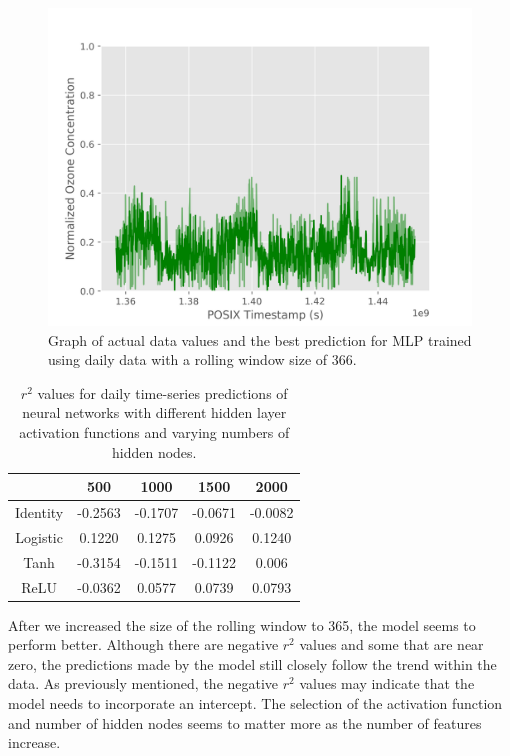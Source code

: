 \documentclass{article}
\begin{document}
\begin{figure}[H]
    \begin{center}
        \includegraphics[scale=0.75]{D366_500_TANH.png}
    \end{center}
    \caption{Graph of actual data values and the best prediction for MLP trained using daily data with a rolling window size of 366.}
\end{figure}

\begin{table}[H]
    \centering
    \begin{tabular}{| c | c | c | c | c |}
        \hline
        \cellcolor{black} & \cellcolor{Gray} 500 & \cellcolor{Gray} 1000 & \cellcolor{Gray} 1500 & \cellcolor{Gray} 2000 \\
        \hline
        \cellcolor{Gray} Identity & -0.2563 & -0.1707 & -0.0671 & -0.0082 \\
        \hline
        \cellcolor{Gray} Logistic & 0.1220 & 0.1275 & 0.0926 & 0.1240 \\
        \hline
        \cellcolor{Gray} Tanh & \cellcolor{green} -0.3154 & -0.1511 & -0.1122 & 0.006 \\
        \hline
        \cellcolor{Gray} ReLU & -0.0362 & 0.0577 & 0.0739 & 0.0793 \\
        \hline
    \end{tabular}
    \caption{$r^2$ values for daily time-series predictions of neural networks with different hidden layer activation functions and varying numbers of hidden nodes.}
\end{table}

After we increased the size of the rolling window to 365, the model seems to perform better. Although there are negative $r^2$ values and some that are near zero, the predictions made by the model still closely follow the trend within the data. As previously mentioned, the negative $r^2$ values may indicate that the model needs to incorporate an intercept. The selection of the activation function and number of hidden nodes seems to matter more as the number of features increase.
\end{document}
